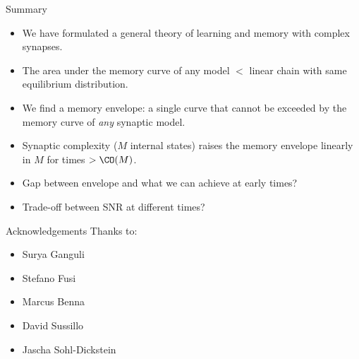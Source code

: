 \documentclass{beamer}%
\begin{document}
\begin{frame}{Summary}
%
  \begin{itemize}
    \item We have formulated a general theory of learning and memory with complex synapses.
    \item The area under the memory curve of any model $<$ linear chain with same equilibrium distribution.
    \item We find a memory envelope: a single curve that cannot be exceeded by the memory curve of \emph{any} synaptic model.
    \item Synaptic complexity ($M$ internal states) raises the memory envelope linearly in $M$ for times $> \CO(M)$.
    \item Gap between envelope and what we can achieve at early times?
    \item Trade-off between SNR at different times?
  \end{itemize}

%
\end{frame}





%
%
%

\begin{frame}{Acknowledgements}
%
 Thanks to:
 \begin{itemize}
   \item Surya Ganguli
   \item Stefano Fusi
   \item Marcus Benna
   \item David Sussillo
   \item Jascha Sohl-Dickstein
 \end{itemize}
%
\end{frame}

\appendix
\end{document}
